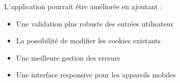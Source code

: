 \documentclass{article}
\begin{document}
L'application pourrait être améliorée en ajoutant :
\begin{itemize}
    \item Une validation plus robuste des entrées utilisateur
    \item La possibilité de modifier les cookies existants
    \item Une meilleure gestion des erreurs
    \item Une interface responsive pour les appareils mobiles
\end{itemize}
\end{document}
